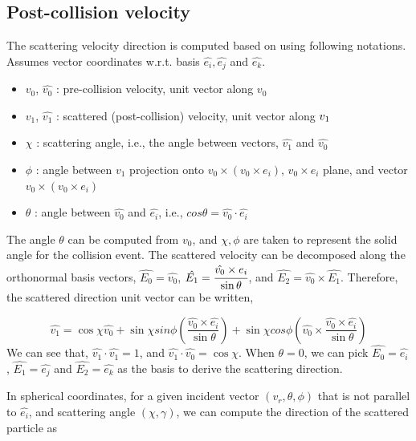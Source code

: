 \documentclass{article}
\begin{document}
\subsection{Post-collision velocity}
The scattering velocity direction is computed based on using following notations. Assumes vector coordinates w.r.t. basis $\hat{e_i},\hat{e_j}$ and $\hat{e_k}$.

\begin{itemize}
    \item $v_0$, $\hat{v_0}$ : pre-collision velocity, unit vector along $v_0$
    \item $v_1$, $\hat{v_1}$ : scattered (post-collision) velocity, unit vector along $\boldmath{v_1}$
    \item $\chi$ : scattering angle, i.e., the angle between vectors, $\hat{v_1}$ and  $\hat{v_0}$
    \item $\phi$ : angle between $v_1$ projection onto $v_0 \times(v_0 \times e_i)$, $v_0 \times e_i$ plane, and vector $v_0 \times(v_0 \times e_i)$
    \item $\theta$ : angle between $\hat{v_0}$ and $\hat{e_i}$, i.e., $cos\theta = \hat{v_0} \cdot \hat{e_i}$
\end{itemize}
The angle $\theta$ can be computed from $v_0$, and $\chi,\phi$ are taken to represent the solid angle for the collision event. The scattered velocity can be decomposed along the orthonormal basis vectors, $\hat{E_0}=\hat{v_{0}}$, $\hat{E_1}= \cfrac{\hat{v_0}\times e_i}{\sin\theta}$, and $\hat{E_2}= \hat{v_0}\times \hat{E_1}$. Therefore, the scattered direction unit vector can be written, 

\begin{equation}
    \hat{v_1} = \cos\chi \hat{v_0} + \sin\chi sin\phi (\frac{\hat{v_0}\times \hat{e_i}}{\sin\theta}) + \sin\chi cos\phi (\hat{v_0}\times \frac{\hat{v_0}\times \hat{e_i}}{\sin\theta}) \label{eq:scatter}
\end{equation}
We can see that, $\hat{v_1}\cdot \hat{v_1}=1$, and $\hat{v_1} \cdot \hat{v_0}= \cos\chi$.
When $\theta = 0 $, we can pick $\hat{E_0}=\hat{e_i}$, $\hat{E_1}=\hat{e_j}$ and $\hat{E_2}=\hat{e_k}$ as the basis to derive the scattering direction. 

In spherical coordinates, for a given incident vector $(v_r,\theta,\phi)$ that is not parallel to $\hat{e_i}$,  and scattering angle $(\chi,\gamma)$, we can compute the direction of the scattered particle as 
\end{document}

